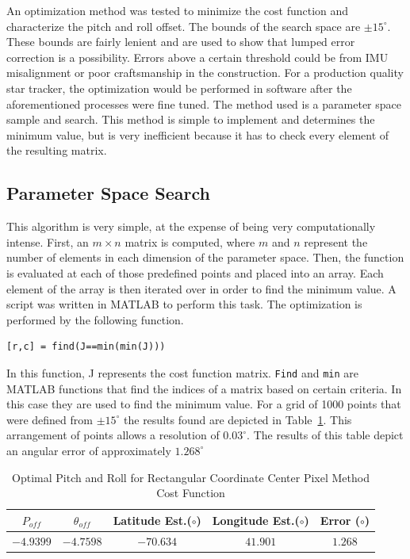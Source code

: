\documentclass[12pt,a4paper]{book}
\begin{document}
\FloatBarrier
An optimization method was tested to minimize the cost function and characterize the pitch and roll offset. The bounds of the search space are $\pm 15^{\circ}$.  These bounds are fairly lenient and are used to show that lumped error correction is a possibility.  Errors above a certain threshold could be from IMU misalignment or poor craftsmanship in the construction.  For a production quality star tracker, the optimization would be performed in software after the aforementioned processes were fine tuned.  The method used is a parameter space sample and search. This method is simple to implement and determines the minimum value, but is very inefficient because it has to check every element of the resulting matrix. %
\subsection*{Parameter Space Search}
This algorithm is very simple, at the expense of being very computationally intense.  First, an $m \times n$ matrix is computed, where $m$ and $n$ represent the number of elements in each dimension of the parameter space.  Then, the function is evaluated at each of those predefined points and placed into an array.  Each element of the array is then iterated over in order to find the minimum value.  A script was written in MATLAB to perform this task.  The optimization is performed by the following function.

\begin{verbatim}
[r,c] = find(J==min(min(J)))
\end{verbatim}
In this function, J represents the cost function matrix. \verb|Find| and \verb|min| are MATLAB functions that find the indices of a matrix based on certain criteria.  In this case they are used to find the minimum value.    
For a grid of 1000 points that were defined from $\pm 15^{\circ}$ the results found are depicted in Table~\ref{t:parameterSearch}.  This arrangement of points allows a resolution of $0.03^{\circ}$.  The results of this table depict an angular error of approximately $1.268^{\circ}$ 

\begin{table}[ht!]
\centering
\begin{tabular}{ |c|c|c|c|c| } 
 \hline
 $P_{off}$ & $\theta_{off}$ & Latitude Est.($\circ$) & Longitude Est.($\circ$)&Error ($\circ$) \\ 
 \hline
 $-4.9399$ & $-4.7598$ & $-70.634$ & $41.901$ &$1.268$   \\ 
 \hline
\end{tabular}
\caption{Optimal Pitch and Roll for Rectangular Coordinate Center Pixel Method Cost Function}
\label{t:parameterSearch}
\end{table}
\end{document}
